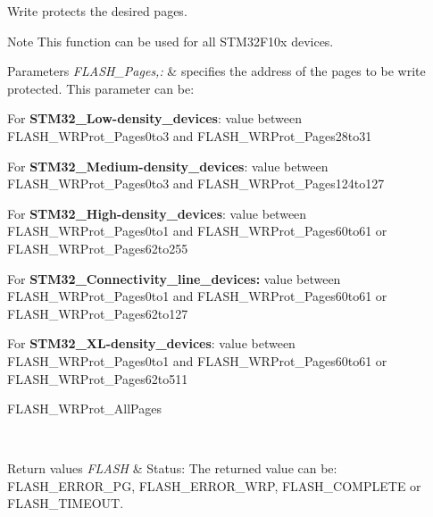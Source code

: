 Write protects the desired pages. 

\begin{DoxyNote}{Note}
This function can be used for all S\-T\-M32\-F10x devices. 
\end{DoxyNote}

\begin{DoxyParams}{Parameters}
{\em F\-L\-A\-S\-H\-\_\-\-Pages,\-:} & specifies the address of the pages to be write protected. This parameter can be\-: \begin{DoxyItemize}
\item For {\bfseries S\-T\-M32\-\_\-\-Low-\/density\-\_\-devices}\-: value between F\-L\-A\-S\-H\-\_\-\-W\-R\-Prot\-\_\-\-Pages0to3 and F\-L\-A\-S\-H\-\_\-\-W\-R\-Prot\-\_\-\-Pages28to31 \item For {\bfseries S\-T\-M32\-\_\-\-Medium-\/density\-\_\-devices}\-: value between F\-L\-A\-S\-H\-\_\-\-W\-R\-Prot\-\_\-\-Pages0to3 and F\-L\-A\-S\-H\-\_\-\-W\-R\-Prot\-\_\-\-Pages124to127 \item For {\bfseries S\-T\-M32\-\_\-\-High-\/density\-\_\-devices}\-: value between F\-L\-A\-S\-H\-\_\-\-W\-R\-Prot\-\_\-\-Pages0to1 and F\-L\-A\-S\-H\-\_\-\-W\-R\-Prot\-\_\-\-Pages60to61 or F\-L\-A\-S\-H\-\_\-\-W\-R\-Prot\-\_\-\-Pages62to255 \item For {\bfseries S\-T\-M32\-\_\-\-Connectivity\-\_\-line\-\_\-devices\-:} value between F\-L\-A\-S\-H\-\_\-\-W\-R\-Prot\-\_\-\-Pages0to1 and F\-L\-A\-S\-H\-\_\-\-W\-R\-Prot\-\_\-\-Pages60to61 or F\-L\-A\-S\-H\-\_\-\-W\-R\-Prot\-\_\-\-Pages62to127 \item For {\bfseries S\-T\-M32\-\_\-\-X\-L-\/density\-\_\-devices}\-: value between F\-L\-A\-S\-H\-\_\-\-W\-R\-Prot\-\_\-\-Pages0to1 and F\-L\-A\-S\-H\-\_\-\-W\-R\-Prot\-\_\-\-Pages60to61 or F\-L\-A\-S\-H\-\_\-\-W\-R\-Prot\-\_\-\-Pages62to511 \item F\-L\-A\-S\-H\-\_\-\-W\-R\-Prot\-\_\-\-All\-Pages \end{DoxyItemize}
\\
\hline
\end{DoxyParams}

\begin{DoxyRetVals}{Return values}
{\em F\-L\-A\-S\-H} & Status\-: The returned value can be\-: F\-L\-A\-S\-H\-\_\-\-E\-R\-R\-O\-R\-\_\-\-P\-G, F\-L\-A\-S\-H\-\_\-\-E\-R\-R\-O\-R\-\_\-\-W\-R\-P, F\-L\-A\-S\-H\-\_\-\-C\-O\-M\-P\-L\-E\-T\-E or F\-L\-A\-S\-H\-\_\-\-T\-I\-M\-E\-O\-U\-T. \\
\hline
\end{DoxyRetVals}


